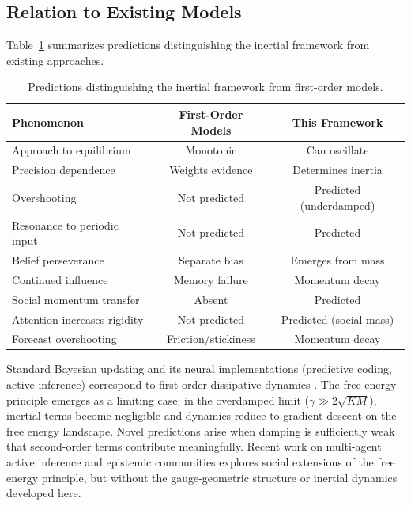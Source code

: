 \documentclass[12pt]{article}
\begin{document}
\subsection{Relation to Existing Models}

Table~\ref{tab:model_comparison} summarizes predictions distinguishing the inertial framework from existing approaches.

\begin{table}[ht]
\centering
\caption{Predictions distinguishing the inertial framework from first-order models.}
\label{tab:model_comparison}
\begin{tabular}{lcc}
\hline
\textbf{Phenomenon} & \textbf{First-Order Models} & \textbf{This Framework} \\
\hline
Approach to equilibrium & Monotonic & Can oscillate \\
Precision dependence & Weights evidence & Determines inertia \\
Overshooting & Not predicted & Predicted (underdamped) \\
Resonance to periodic input & Not predicted & Predicted \\
Belief perseverance & Separate bias & Emerges from mass \\
Continued influence & Memory failure & Momentum decay \\
Social momentum transfer & Absent & Predicted \\
Attention increases rigidity & Not predicted & Predicted (social mass) \\
Forecast overshooting & Friction/stickiness & Momentum decay \\
\hline
\end{tabular}
\end{table}

Standard Bayesian updating and its neural implementations (predictive coding, active inference) correspond to first-order dissipative dynamics \citep{Friston2010, bogacz2017tutorial}. The free energy principle emerges as a limiting case: in the overdamped limit ($\gamma \gg 2\sqrt{KM}$), inertial terms become negligible and dynamics reduce to gradient descent on the free energy landscape. Novel predictions arise when damping is sufficiently weak that second-order terms contribute meaningfully. Recent work on multi-agent active inference \citep{flache2017models} and epistemic communities explores social extensions of the free energy principle, but without the gauge-geometric structure or inertial dynamics developed here.
\end{document}
